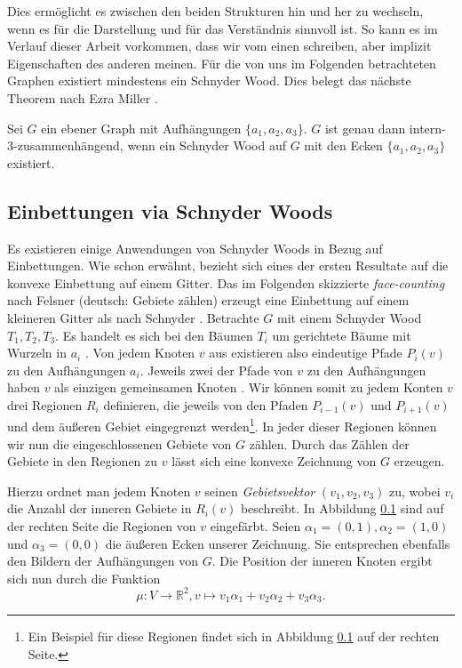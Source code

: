 Dies ermöglicht es zwischen den beiden Strukturen hin und her zu wechseln, wenn es für die Darstellung und für das Verständnis sinnvoll ist. So kann es im Verlauf dieser Arbeit vorkommen, dass wir vom einen schreiben, aber implizit Eigenschaften des anderen meinen. Für die von uns im Folgenden betrachteten Graphen existiert mindestens ein Schnyder Wood. Dies belegt das nächste Theorem nach Ezra Miller \cite[Theorem A]{miller02}.

\begin{theorem}
Sei $G$ ein ebener Graph mit Aufhängungen $\{a_1,a_2,a_3\}$. $G$ ist genau dann intern-3-zusammenhängend, wenn ein Schnyder Wood auf $G$ mit den Ecken $\{a_1,a_2,a_3\}$ existiert.
\end{theorem}

\subsection{Einbettungen via Schnyder Woods}\label{face_counting}

Es existieren einige Anwendungen von Schnyder Woods in Bezug auf Einbettungen. Wie schon erwähnt, bezieht sich eines der ersten Resultate auf die konvexe Einbettung auf einem Gitter. Das im Folgenden skizzierte \textit{face-counting} nach Felsner (deutsch: Gebiete zählen) erzeugt eine Einbettung auf einem kleineren Gitter als nach Schnyder \cite{felsner01}. Betrachte $G$ mit einem Schnyder Wood $T_1,T_2,T_3$. Es handelt es sich bei den Bäumen $T_i$ um gerichtete Bäume mit Wurzeln in $a_i$ \cite[Korollar 2.5]{felsner12}. Von jedem Knoten $v$ aus existieren also eindeutige Pfade $P_i(v)$ zu den Aufhängungen $a_i$. Jeweils zwei der Pfade von $v$ zu den Aufhängungen haben $v$ als einzigen gemeinsamen Knoten \cite[Lemma 2.4]{felsner12}. Wir können somit zu jedem Konten $v$ drei Regionen $R_i$ definieren, die jeweils von den Pfaden $P_{i-1}(v)$ und $P_{i+1}(v)$ und dem äußeren Gebiet eingegrenzt werden\footnote{Ein Beispiel für diese Regionen findet sich in Abbildung \ref{face_counting} auf der rechten Seite.}. In jeder dieser Regionen können wir nun die eingeschlossenen Gebiete von $G$ zählen. Durch das Zählen der Gebiete in den Regionen zu $v$ lässt sich eine konvexe Zeichnung von $G$ erzeugen.

Hierzu ordnet man jedem Knoten $v$ seinen \textit{Gebietsvektor} $(v_1,v_2,v_3)$ zu, wobei $v_i$ die Anzahl der inneren Gebiete in $R_i(v)$ beschreibt. In Abbildung \ref{face_counting} sind auf der rechten Seite die Regionen von $v$ eingefärbt. Seien $\alpha_1 = (0,1),\alpha_2 = (1,0)$ und $\alpha_3 = (0,0)$ die äußeren Ecken unserer Zeichnung. Sie entsprechen ebenfalls den Bildern der Aufhängungen von $G$. Die Position der inneren Knoten ergibt sich nun durch die Funktion 
$$\mu: V \to \mathbb{R}^2,v\mapsto v_1\alpha_1 + v_2\alpha_2+v_3\alpha_3.$$ 

